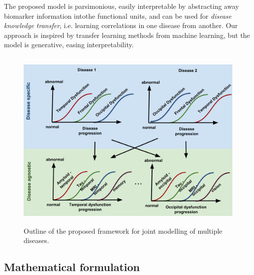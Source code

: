 \documentclass{llncs}
\begin{document}
The proposed model is parsimonious, easily interpretable by abstracting away biomarker information intothe functional units, and can be used for \emph{disease knowledge transfer}, i.e. learning correlations in one disease from another. Our approach is inspired by transfer learning methods from machine learning, but the model is generative, easing interpretability.   


\begin{figure}[h]
 \centering
 \includegraphics[height=9cm]{figures/disease_knowledge_transfer.png}
 \caption{Outline of the proposed framework for joint modelling of multiple diseases. }
\end{figure}

\subsection{Mathematical formulation}
\end{document}

